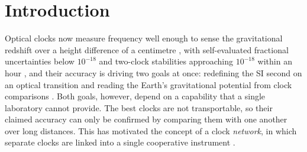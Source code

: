 \documentclass[11pt,a4paper]{article}
\begin{document}
\begin{abstract}
\end{abstract}


\section{Introduction}
Optical clocks now measure frequency well enough to sense the
gravitational redshift over a height difference of a centimetre
\citep{mcgrew2018geodesy}, with self-evaluated fractional uncertainties
below $10^{-18}$ \citep{arnold2026lu, zhang2026ca} and two-clock
stabilities approaching $10^{-18}$ within an hour
\citep{oelker2019stability}, and their accuracy is driving two goals at
once: redefining the SI second on an optical transition and reading the
Earth's gravitational potential from clock comparisons
\citep{dimarcq2024roadmap, grotti2018geodesy}. Both goals, however,
depend on a capability that a single laboratory cannot provide. The best
clocks are not transportable, so their claimed accuracy can only be
confirmed by comparing them with one another over long distances. This
has motivated the concept of a clock \emph{network}, in which separate
clocks are linked into a single cooperative instrument
\citep{riehle2017networks, komar2014quantumnetwork}.
\end{document}
